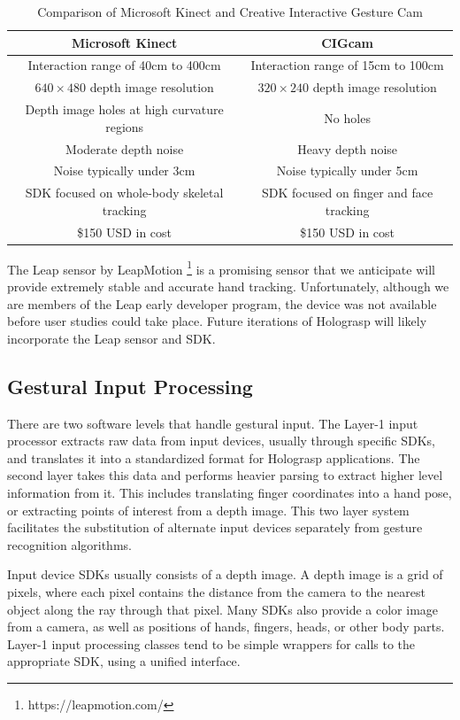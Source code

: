 \documentclass[pageno]{jpaper}
\begin{document}
\begin{table}[h]
\begin{tabular}{|c|c|}
\hline
{\bf Microsoft Kinect} & {\bf CIGcam} \\ \hline
Interaction range of 40cm to 400cm & Interaction range of 15cm to 100cm \\
$640 \times 480$ depth image resolution & $320 \times 240$ depth image resolution \\
Depth image holes at high curvature regions & No holes \\
Moderate depth noise & Heavy depth noise \\
Noise typically under 3cm & Noise typically under 5cm \\
SDK focused on whole-body skeletal tracking & SDK focused on finger and face tracking \\
\$150 USD in cost & \$150 USD in cost \\
\hline
\end{tabular}
\caption{Comparison of Microsoft Kinect and Creative Interactive Gesture Cam}
\label{tab:comparison}
\end{table}

The Leap sensor by LeapMotion \footnote{https://leapmotion.com/} is a promising sensor that we anticipate will provide extremely stable and
accurate hand tracking. Unfortunately, although we are members of the Leap early developer program, the device was not available
before user studies could take place. Future iterations of Holograsp will likely incorporate the Leap sensor and SDK.

\subsection{Gestural Input Processing}
There are two software levels that handle gestural input. The Layer-1 input processor extracts raw data from input devices, usually through specific
SDKs, and translates it into a standardized format for Holograsp applications. The second layer takes this data and performs heavier
parsing to extract higher level information from it. This includes translating finger coordinates into a hand pose, or extracting
points of interest from a depth image. This two layer system facilitates the substitution of alternate input devices separately from
gesture recognition algorithms.

Input device SDKs usually consists of a depth image. A depth image is a grid of pixels, where each
pixel contains the distance from the camera to the nearest object along the ray through that pixel. Many SDKs
also provide a color image from a camera, as well as positions of hands, fingers, heads, or other body parts.
Layer-1 input processing classes tend to be simple wrappers for calls to the appropriate SDK, using a unified
interface.
\end{document}
